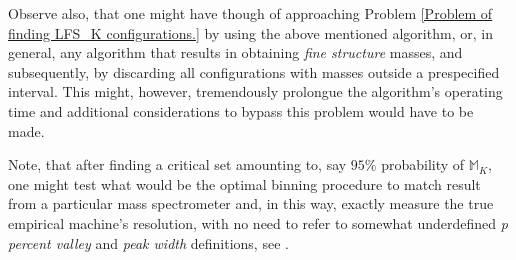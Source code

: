 Observe also, that one might have though of approaching Problem \ref{Problem of finding LFS_K configurations.} by using the above mentioned algorithm, or, in general, any algorithm that results in obtaining {\it fine structure} masses, and subsequently, by discarding all configurations with masses outside a prespecified interval. This might, however, tremendously prolongue the algorithm's operating time and additional considerations to bypass this problem would have to be made. 

Note, that after finding a critical set amounting to, say $95\%$ probability of $\mathbb{M}_K$, one might test what would be the optimal binning procedure to match result from a particular mass spectrometer and, in this way, exactly measure the true empirical machine's resolution, with no need to refer to somewhat underdefined {\it p percent valley} and {\it peak width} definitions, see \cite{Eidhammer2008ComputationalMethodsInMassSpectrometry}.   